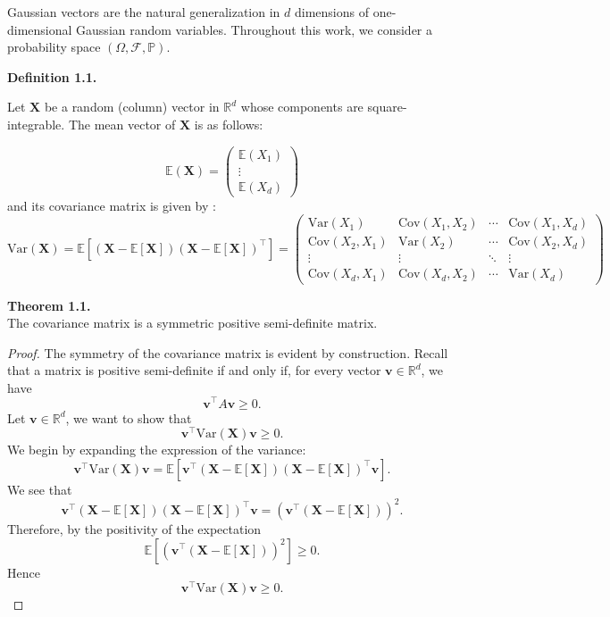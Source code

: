 \documentclass[12pt]{article}
\begin{document}
Gaussian vectors are the natural generalization in $d$ dimensions of one-dimensional Gaussian random variables. Throughout this work, we consider a probability space $(\Omega, \mathcal{F}, \mathbb{P})$.

\vspace{0.3cm}

\textbf{Definition 1.1.}

Let $\mathbf{X}$ be a random (column) vector in $\mathbb{R}^d$ whose components are square-integrable. The mean vector of $\mathbf{X}$ is as follows:

\[
\mathbb{E}(\mathbf{X}) =
\begin{pmatrix}
\mathbb{E}(X_1) \\
\vdots \\
\mathbb{E}(X_d)
\end{pmatrix}
\]
and its covariance matrix is given by :
\[
\mathrm{Var}(\mathbf{X}) = \mathbb{E}\!\left[(\mathbf{X} - \mathbb{E}[\mathbf{X}])(\mathbf{X} - \mathbb{E}[\mathbf{X}])^\top\right] =
\begin{pmatrix}
\mathrm{Var}(X_1) & \mathrm{Cov}(X_1, X_2) & \cdots & \mathrm{Cov}(X_1, X_d) \\
\mathrm{Cov}(X_2, X_1) & \mathrm{Var}(X_2) & \cdots & \mathrm{Cov}(X_2, X_d) \\
\vdots & \vdots & \ddots & \vdots \\
\mathrm{Cov}(X_d, X_1) & \mathrm{Cov}(X_d, X_2) & \cdots & \mathrm{Var}(X_d)
\end{pmatrix}
\]

\textbf{Theorem 1.1.}\\
The covariance matrix is a symmetric positive semi-definite matrix.

\begin{proof}
The symmetry of the covariance matrix is evident by construction. Recall that a matrix is positive semi-definite if and only if, for every vector $\mathbf{v} \in \mathbb{R}^d$, we have
\[
\mathbf{v}^\top A \mathbf{v} \geq 0.
\]
Let $\mathbf{v} \in \mathbb{R}^d$, we want to show that
\[
\mathbf{v}^\top \mathrm{Var}(\mathbf{X}) \mathbf{v} \geq 0.
\]
We begin by expanding the expression of the variance:
\[
\mathbf{v}^\top \mathrm{Var}(\mathbf{X}) \mathbf{v} = \mathbb{E}\!\left[\mathbf{v}^\top (\mathbf{X} - \mathbb{E}[\mathbf{X}]) (\mathbf{X} - \mathbb{E}[\mathbf{X}])^\top \mathbf{v}\right].
\]
We see that
\[
\mathbf{v}^\top (\mathbf{X} - \mathbb{E}[\mathbf{X}]) (\mathbf{X} - \mathbb{E}[\mathbf{X}])^\top \mathbf{v} = \left( \mathbf{v}^\top (\mathbf{X} - \mathbb{E}[\mathbf{X}]) \right)^2.
\]
Therefore, by the positivity of the expectation
\[
\mathbb{E}\!\left[\left( \mathbf{v}^\top (\mathbf{X} - \mathbb{E}[\mathbf{X}]) \right)^2\right] \geq 0.
\]
Hence
\[
\mathbf{v}^\top \mathrm{Var}(\mathbf{X}) \mathbf{v} \geq 0.
\]
\end{proof}
\end{document}
